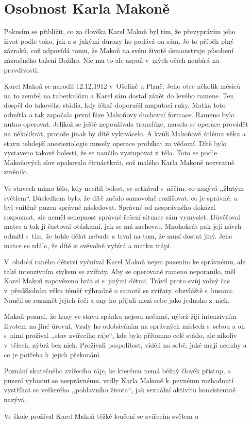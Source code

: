 \chapter{Osobnost Karla Makoně}

Pokusím se přiblížit, co za člověka Karel Makoň byl tím, že převyprávím jeho
život podle toho, jak a s~jakými důrazy ho podává on sám. Je to příběh plný
zázraků, což odpovídá tomu, že Makoň na svém životě demonstruje působení
zázračného tažení Božího. Nic mu to ale aspoň v~mých očích neubírá na
pravdivosti.

Karel Makoň se narodil 12.12.1912 v~Ošelíně u Plzně. Jeho otec několik měsíců na
to zemřel na tuberkulózu a Karel sám dostal zánět do levého ramene. Ten dospěl
do takového stádia, kdy lékař doporučil amputaci ruky. Matka toto odmítla a tak
započala první fáze Makoňovy duchovní formace. Rameno bylo nutno operovat.
Jelikož se ještě nepoužívala transfúze, musela se operace provádět na
několikrát, protože jinak by dítě vykrvácelo. A kvůli Makoňově útlému věku a
stavu tehdejší anesteziologie musely operace probíhat za vědomí. Dítě bylo
vystaveno takové bolesti, že se naučilo vystupovat z~těla. Toto se podle
Makoňových slov opakovalo čtrnáctkrát, což malého Karla Makoně nezvratně
změnilo.

Ve stavech mimo tělo, kdy necítil bolest, se setkával s~něčím, co nazývá
,,žlutým světlem``.  Důsledkem bylo, že dítě začalo samovolně rozlišovat, co je
správné, a byl vnitřně puzen správné následovat. Správné od nesprávného dokázal
rozpoznat, ale neměl schopnost správné řešení situace sám vymyslet. Důvěřoval
matce a tak ji častoval otázkami, jak se má zachovat. Mnohokrát pak její návrh
odmítl s~tím, že tohle dělat nebude a trval na tom, že musí dostat jiný. Jeho
matce se zdálo, že dítě si svévolně vybírá a matku trápí.

V~období raného dětství vyčníval Karel Makoň nejen puzením ke správnému, ale
také intenzivním stykem se zvířaty. Aby se operované rameno neporanilo, měl
Karel Makoň zapovězeno hrát si s~jinými dětmi. Trávil proto svůj volný čas
v~předškolním věku téměř výhradně o samotě se zvířaty, obzvláště s~husami.
Naučil se rozumět jejich řeči a ony ho přijali mezi sebe jako jednoho z~nich.

Makoň poznal, že husy ve stavu spánku nejsou nečinné, nýbrž žijí intenzivním
životem na jiné úrovni. Vzaly ho oďobáváním na správných místech s~sebou a on
s~nimi prožíval ,,stav zvířecího ráje``, kde bylo přítomno celé stádo, ale
nikoliv v~tělech, nýbrž bez nich. Prožívali pospolitost, viděli na sobě, jaké
mají neduhy a co je potřeba k~jejich překonání.

Poznání skutečného zvířecího ráje, ke kterému nemá běžný člověk přístup, a
puzení vyhnout se nesprávnému, vedly Karla Makoně k~pevnému rozhodnutí vystříhat
se veškerého ,,pohlavního života``, jak sexuální aktivitu konzistentně nazývá.

Ve škole prožíval Karel Makoň těžké loučení se zvířecím světem a 


